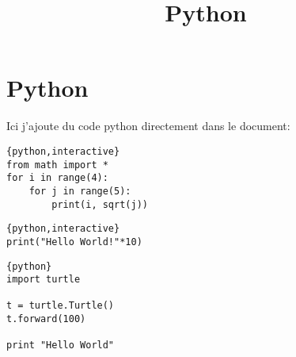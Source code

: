 \documentclass[a4paper,11pt]{article}
\begin{document}
\title{Python}
\date{}
\maketitle


\section{Python}
Ici j'ajoute du code python directement dans le document:\par
\begin{verbatim}{python,interactive}
from math import *
for i in range(4):
    for j in range(5):
        print(i, sqrt(j))
\end{verbatim}

\begin{verbatim}{python,interactive}
print("Hello World!"*10)
\end{verbatim}

\begin{verbatim}{python}
import turtle

t = turtle.Turtle()
t.forward(100)

print "Hello World"
\end{verbatim}
\end{document}

